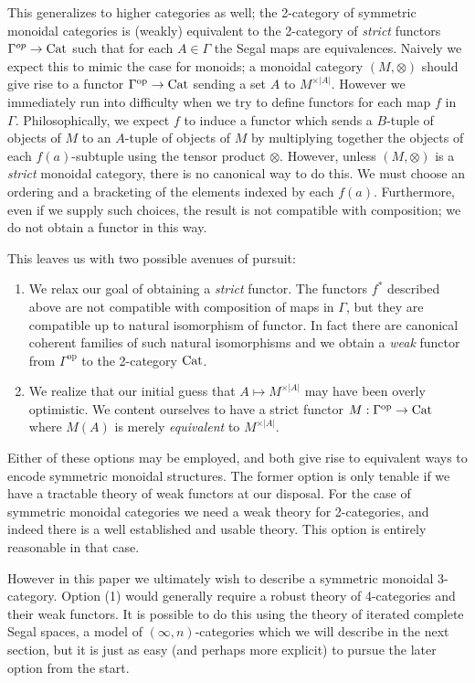 \documentclass{amsart}
\begin{document}
This generalizes to higher categories as well; the 2-category of symmetric monoidal categories is (weakly) equivalent to the 2-category of {\em strict} functors $\Gamma^{op} \to \mathrm{Cat}$ such that for each $A \in \Gamma$ the Segal maps are equivalences. Naively we expect this to mimic the case for monoids; a monoidal category $(M, \otimes)$ should give rise to a functor $\Gamma^\text{op} \to \mathrm{Cat}$ sending a set $A$ to $M^{\times |A|}$. However we immediately run into difficulty when we try to define functors for each map $f$ in $\Gamma$. Philosophically, we expect $f$ to induce a functor which sends a $B$-tuple of objects of $M$ to an $A$-tuple of objects of $M$ by multiplying together the objects of each $f(a)$-subtuple using the tensor product $\otimes$. However, unless $(M, \otimes)$ is a {\em strict} monoidal category, there is no canonical way to do this. We must choose an ordering and a bracketing of the elements indexed by each $f(a)$. Furthermore, even if we supply such choices, the result is not compatible with composition; we do not obtain a functor in this way. 

This leaves us with two possible avenues of pursuit:
\begin{enumerate}
	\item We relax our goal of obtaining a {\em strict} functor. The functors $f^*$ described above are not compatible with composition of maps in $\Gamma$, but they are compatible up to natural isomorphism of functor. In fact there are canonical coherent families of such natural isomorphisms and we obtain a {\em weak} functor from $\Gamma^\text{op}$ to the 2-category $\mathrm{Cat}$. 
	\item We realize that our initial guess that $A \mapsto M^{\times |A|}$ may have been overly optimistic. We content ourselves to have a strict functor $M: \Gamma^\text{op} \to \mathrm{Cat}$ where $M(A)$ is merely {\em equivalent} to  $M^{\times |A|}$. 
\end{enumerate}
Either of these options may be employed, and both give rise to equivalent ways to encode symmetric monoidal structures. The former option is only tenable if we have a tractable theory of weak functors at our disposal. For the case of symmetric monoidal categories we need a weak theory for 2-categories, and indeed there is a well established and usable theory. This option is entirely reasonable in that case. 

However in this paper we ultimately wish to describe a symmetric monoidal 3-category. Option (1) would generally require a robust theory of 4-categories and their weak functors. It is possible to do this using the theory of iterated complete Segal spaces, a model of $(\infty, n)$-categories which we will describe in the next section, but it is just as easy (and perhaps more explicit) to pursue the later option from the start. 
\end{document}
